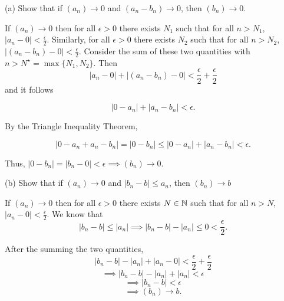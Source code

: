 \documentclass{report}
\begin{document}
(a) Show that if $\left(a_n\right) \rightarrow 0$ and $\left(a_n-b_n\right) \rightarrow 0$, then $\left(b_n\right) \rightarrow 0$.
\begin{myproof}
    
  If $\left(a_n\right) \rightarrow 0$ then for all $\epsilon >0$ there exists $N_1$ such that for all $n> N_1$, $|a_n - 0| < \frac{\epsilon}{2}.$ Similarly, for all $\epsilon >0$ there exists $N_2$ such that for all $n > N_2$, $| (a_n - b_n) - 0 |< \frac{\epsilon}{2}.$ Consider the sum of these two quantities with $n >N^\star = \max\{N_1,N_2\}.$ Then 
$$| a_n  - 0 |+ | (a_n - b_n) - 0 |<  \frac{\epsilon}{2} + \frac{\epsilon}{2}$$ and it follows

$$| 0 - a_n |+ |a_n - b_n|<  \epsilon.$$

By the Triangle Inequality Theorem, 

$$|0 - a_n  + a_n - b_n| = |0 - b_n| \leq | 0 - a_n |+ |a_n - b_n|< \epsilon.$$

Thus, $|0 - b_n| = |b_n - 0 |< \epsilon \implies (b_n) \rightarrow 0.$

\end{myproof}


\bigskip
(b) Show that if $\left(a_n\right) \rightarrow 0$ and $\left|b_n-b\right| \leq a_n$, then $\left(b_n\right) \rightarrow b$

\begin{myproof}
    
  If $(a_n) \rightarrow 0 $ then for all $\epsilon > 0 $ there exists
$N \in \NN$ such that for all $n > N$, $|a_n - 0| < \frac{\epsilon}{2}.$ We know that $$|b_n - b| \leq |a_n|  \implies |b_n - b| - |a_n|\leq 0 < \frac{\epsilon}{2}.$$

After the summing the two quantities,
 $$|b_n - b| - |a_n| + |a_n -0| < \frac{\epsilon}{2} + \frac{\epsilon}{2}$$ $$\implies |b_n - b| - |a_n| + |a_n| < \epsilon$$
$$ \implies |b_n - b|  < \epsilon $$ $$\implies (b_n) \rightarrow b.$$

\end{myproof}

\end{document}
